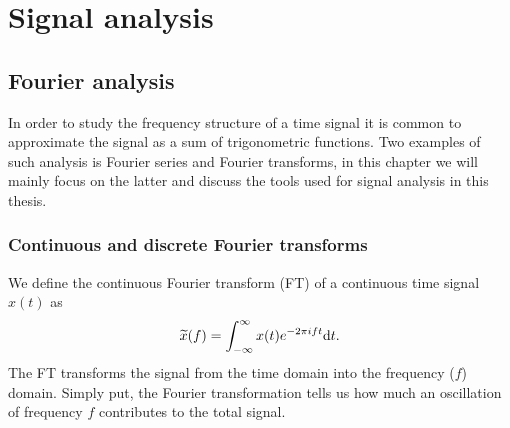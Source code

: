 \chapter{Signal analysis}
\section{Fourier analysis}
In order to study the frequency structure of a time signal it is common 
to approximate the signal as a sum of trigonometric functions. Two examples
of such analysis is Fourier series and Fourier transforms, in this chapter we will mainly
focus on the latter and discuss the tools used for signal analysis in this thesis.
\subsection{Continuous and discrete Fourier transforms}
We define the continuous Fourier transform (FT) of a continuous time signal $x(t)$ as  
\begin{equation} \label{eqSA:cf}
\widetilde{x}(f) = \int_{-\infty}^{\infty} x(t) e^{-2 \pi i f t} \mathrm{d} t. 
\end{equation}
The FT transforms the signal from the time domain into the frequency ($f$) domain.
Simply put, the Fourier transformation tells us how much an oscillation of frequency $f$ contributes to the total signal. 

